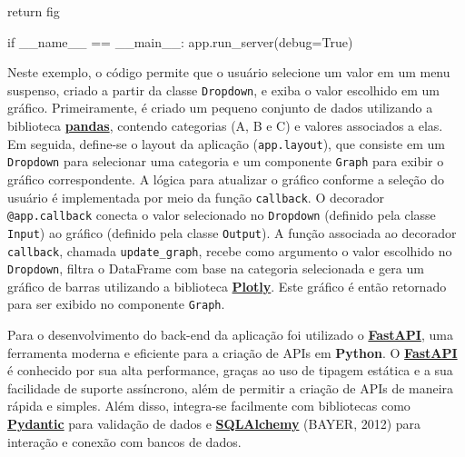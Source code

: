 \documentclass[
  12pt,
  a4paper,
]{scrreprt}
\newenvironment{Shaded}{}{}
\newcommand{\ControlFlowTok}[1]{\textcolor[rgb]{0.84,0.23,0.29}{#1}}
\newcommand{\NormalTok}[1]{\textcolor[rgb]{0.14,0.16,0.18}{#1}}
\newcommand{\OperatorTok}[1]{\textcolor[rgb]{0.14,0.16,0.18}{#1}}
\newcommand{\StringTok}[1]{\textcolor[rgb]{0.01,0.18,0.38}{#1}}
\newcommand{\VariableTok}[1]{\textcolor[rgb]{0.89,0.38,0.04}{#1}}
\begin{document}
\begin{Shaded}
\begin{Highlighting}[]
    \ControlFlowTok{return}\NormalTok{ fig}

\ControlFlowTok{if} \VariableTok{\_\_name\_\_} \OperatorTok{==} \StringTok{\textquotesingle{}\_\_main\_\_\textquotesingle{}}\NormalTok{:}
\NormalTok{    app.run\_server(debug}\OperatorTok{=}\VariableTok{True}\NormalTok{)}
\end{Highlighting}
\end{Shaded}

Neste exemplo, o código permite que o usuário selecione um valor em um
menu suspenso, criado a partir da classe \texttt{Dropdown}, e exiba o
valor escolhido em um gráfico. Primeiramente, é criado um pequeno
conjunto de dados utilizando a biblioteca
\href{https://pandas.pydata.org/}{\textbf{pandas}}, contendo categorias
(A, B e C) e valores associados a elas. Em seguida, define-se o layout
da aplicação (\texttt{app.layout}), que consiste em um \texttt{Dropdown}
para selecionar uma categoria e um componente \texttt{Graph} para exibir
o gráfico correspondente. A lógica para atualizar o gráfico conforme a
seleção do usuário é implementada por meio da função \texttt{callback}.
O decorador \texttt{@app.callback} conecta o valor selecionado no
\texttt{Dropdown} (definido pela classe \texttt{Input}) ao gráfico
(definido pela classe \texttt{Output}). A função associada ao decorador
\texttt{callback}, chamada \texttt{update\_graph}, recebe como argumento
o valor escolhido no \texttt{Dropdown}, filtra o DataFrame com base na
categoria selecionada e gera um gráfico de barras utilizando a
biblioteca \href{https://plotly.com/}{\textbf{Plotly}}. Este gráfico é
então retornado para ser exibido no componente \texttt{Graph}.

\vspace{12pt}

Para o desenvolvimento do back-end da aplicação foi utilizado o
\href{https://fastapi.tiangolo.com/}{\textbf{FastAPI}}, uma ferramenta
moderna e eficiente para a criação de APIs em \textbf{Python}. O
\href{https://fastapi.tiangolo.com/}{\textbf{FastAPI}} é conhecido por
sua alta performance, graças ao uso de tipagem estática e a sua
facilidade de suporte assíncrono, além de permitir a criação de APIs de
maneira rápida e simples. Além disso, integra-se facilmente com
bibliotecas como
\href{https://docs.pydantic.dev/latest/}{\textbf{Pydantic}} para
validação de dados e
\href{https://www.sqlalchemy.org/}{\textbf{SQLAlchemy}} (BAYER, 2012)
para interação e conexão com bancos de dados.

\vspace{12pt}
\end{document}
